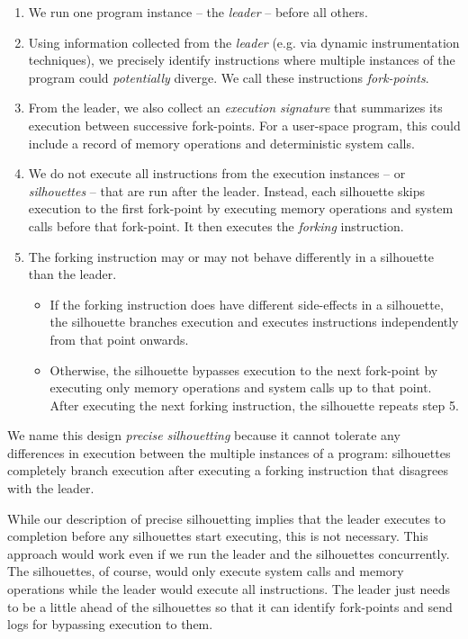 \begin{enumerate}

\item We run one program instance -- the {\em leader} -- before 
all others.

\item Using information collected from the {\em leader} (e.g.
via dynamic instrumentation techniques), 
we precisely identify instructions where
multiple instances of the program could {\em potentially} diverge.
We call these instructions {\em fork-points}.

\item From the leader, we also collect an {\em execution signature} 
that summarizes its execution between successive
fork-points. For a user-space program, this could
include a record of memory operations and 
deterministic system calls.

\item We do not execute all instructions from the execution
instances -- or {\em silhouettes} -- that are run
after the leader. Instead, each silhouette skips execution to
the first fork-point by executing memory
operations and system calls before that fork-point. 
It then executes the {\em forking} instruction.

\item The forking instruction may or 
may not behave differently
in a silhouette than the leader.

\begin{itemize}
\item If the forking instruction
does have different side-effects
in a silhouette, the silhouette branches execution and 
executes instructions independently
from that point onwards. 

\item Otherwise, the silhouette bypasses
execution to the next fork-point by
executing only memory operations and
system calls up to that point.
After executing the next forking instruction,
the silhouette repeats step 5.

\end{itemize}
\end{enumerate}

We name this design {\em precise silhouetting} because
it cannot tolerate any differences in execution
between the multiple instances of a program:
silhouettes completely branch
execution after executing a
forking instruction that disagrees
with the leader. 

While our description of precise silhouetting implies that the leader
executes to completion before any silhouettes 
start executing, this is not necessary.
This approach would work even
if we run the leader and the silhouettes
concurrently. The silhouettes,
of course, would only execute system calls and memory
operations while
the leader would execute all instructions. 
The leader just needs to be a little
ahead of the silhouettes
so that it can identify fork-points
and send logs for bypassing execution to them.

